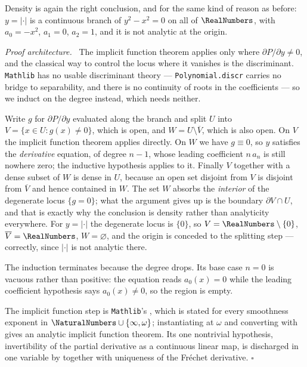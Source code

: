 \documentclass[11pt,oneside]{article}
\theoremstyle{definition}
\theoremstyle{remark}
\newenvironment{proofidea}{\par\smallskip\noindent\textit{Proof architecture.}\ }{\hfill$\square$\par\smallskip}
\begin{document}
Density is again the right conclusion, and for the same kind of reason as
before: $y=|\cdot|$ is a continuous branch of $y^2-x^2=0$ on all of $\RealNumbers$, with
$a_0=-x^2$, $a_1=0$, $a_2=1$, and it is not analytic at the origin.

\begin{proofidea}
The implicit function theorem applies only where $\partial P/\partial y\ne 0$,
and the classical way to control the locus where it vanishes is the
discriminant.  \texttt{Mathlib} has no usable discriminant theory ---
\texttt{Polynomial.discr} carries no bridge to separability, and there is no
continuity of roots in the coefficients --- so we induct on the degree
instead, which needs neither.

Write $g$ for $\partial P/\partial y$ evaluated along the branch and split
$U$ into $V=\{x\in U: g(x)\ne0\}$, which is open, and
$W=U\setminus\overline V$, which is also open.  On $V$ the implicit function
theorem applies directly.  On $W$ we have $g\equiv 0$, so $y$ satisfies the
\emph{derivative} equation, of degree $n-1$, whose leading coefficient
$n\,a_n$ is still nowhere zero; the inductive hypothesis applies to it.
Finally $V$ together with a dense subset of $W$ is dense in $U$, because an
open set disjoint from $V$ is disjoint from $\overline V$ and hence contained
in $W$.  The set $W$ absorbs the \emph{interior} of the degenerate locus
$\{g=0\}$; what the argument gives up is the boundary $\partial V\cap U$, and
that is exactly why the conclusion is density rather than analyticity
everywhere.  For $y=|\cdot|$ the degenerate locus is $\{0\}$, so $V=\RealNumbers
\setminus\{0\}$, $\overline V=\RealNumbers$, $W=\varnothing$, and the origin is conceded
to the splitting step --- correctly, since $|\cdot|$ is not analytic there.

The induction terminates because the degree drops.  Its base case $n=0$ is
vacuous rather than positive: the equation reads $a_0(x)=0$ while the leading
coefficient hypothesis says $a_0(x)\ne0$, so the region is empty.

The implicit function step is \texttt{Mathlib}'s
, which is stated for every smoothness
exponent in $\NaturalNumbers\cup\{\infty,\omega\}$; instantiating at $\omega$ and converting
with  gives an analytic implicit function
theorem.  Its one nontrivial hypothesis, invertibility of the partial
derivative as a continuous linear map, is discharged in one variable by
 together with uniqueness of the
Fréchet derivative.
\end{proofidea}
\end{document}
